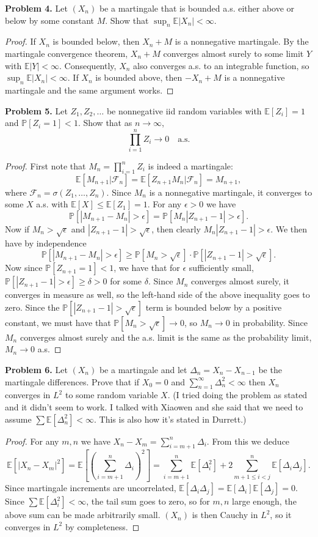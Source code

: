 \documentclass[11pt,letterpaper]{report}
\newcommand{\mcal}[1]{\mathcal{#1}}
\newcommand{\E}{\mathbb{E}}
\newcommand{\Prob}{\mathbb{P}}
\begin{document}
\noindent\textbf{Problem 4. }
Let $(X_n)$ be a martingale that is bounded a.s. either above or below by some constant $M$. Show that $\sup_n \E|X_n|<\infty$.
\begin{proof}
	If $X_n$ is bounded below, then $X_n+M$ is a nonnegative martingale. By the martingale convergence theorem, $X_n+M$ converges almost surely to some limit $Y$ with $\E|Y|<\infty$. Consequently, $X_n$ also converges a.s. to an integrable function, so $\sup_n \E|X_n|<\infty$. If $X_n$ is bounded above, then $-X_n+M$ is a nonnegative martingale and the same argument works.
\end{proof}

\noindent\textbf{Problem 5. }
Let $Z_1, Z_2, \ldots$ be nonnegative iid random variables with $\E[Z_i] = 1$ and $\Prob[Z_i = 1]<1$. Show that as $n\to \infty$,
\[
\prod_{i=1}^n Z_i\to 0\quad\text{a.s.}
\]
\begin{proof}
	First note that $M_n = \prod_{i=1}^nZ_i$ is indeed a martingale:
	\[
	\E[M_{n+1}|\mcal{F}_n] = \E[Z_{n+1}M_n|\mcal{F}_n] = M_{n+1},
	\]
	where $\mcal{F}_n = \sigma(Z_1, \ldots, Z_n)$. Since $M_n$ is a nonnegative martingale, it converges to some $X$ a.s. with $\E[X] \leq \E[Z_1] = 1$. For any $\epsilon>0$ we have
	\[
	\Prob[|M_{n+1}-M_n| > \epsilon] = \Prob[M_n|Z_{n+1}-1|>\epsilon].
	\]
	Now if $M_n>\sqrt{\epsilon}$ and $|Z_{n+1}-1|>\sqrt{\epsilon}$, then clearly $M_n|Z_{n+1}-1|>\epsilon$. We then have by independence
	\[
	\Prob[|M_{n+1}-M_n|>\epsilon] \geq \Prob[M_n>\sqrt{\epsilon}]\cdot\Prob[|Z_{n+1}-1|>\sqrt{\epsilon}].
	\]
	Now since $\Prob[Z_{n+1} = 1]<1$, we have that for $\epsilon$ sufficiently small, $\Prob[|Z_{n+1}-1|>\epsilon] \geq \delta>0$ for some $\delta$. Since $M_n$ converges almost surely, it converges in measure as well, so the left-hand side of the above inequality goes to zero. Since the $\Prob[|Z_{n+1}-1|>\sqrt{\epsilon}]$ term is bounded below by a positive constant, we must have that $\Prob[M_n>\sqrt{\epsilon}]\to 0$, so $M_n\to 0$ in probability. Since $M_n$ converges almost surely and the a.s. limit is the same as the probability limit, $M_n\to 0$ a.s.
\end{proof}

\noindent\textbf{Problem 6. }
Let $(X_n)$ be a martingale and let $\Delta_n = X_n - X_{n-1}$ be the martingale differences. Prove that if $X_0=0$ and $\sum_{n=1}^\infty \Delta_n^2<\infty$ then $X_n$ converges in $L^2$ to some random variable $X$. (I tried doing the problem as stated and it didn't seem to work. I talked with Xiaowen and she said that we need to assume $\sum \E[\Delta_n^2]<\infty$. This is also how it's stated in Durrett.)
\begin{proof}
 	For any $m, n$ we have $X_n-X_m = \sum_{i=m+1}^n \Delta_i$. From this we deduce
 	\[
 	\E[|X_n - X_m|^2] = \E\left[\left(\sum_{i=m+1}^n\Delta_i\right)^2\right] = \sum_{i=m+1}^n\E[\Delta_i^2] + 2\sum_{m+1\leq i<j}^n\E[\Delta_i\Delta_j].
 	\]
 	Since martingale increments are uncorrelated, $\E[\Delta_i\Delta_j] = \E[\Delta_i]\E[\Delta_j] = 0$. Since $\sum \E[\Delta_i^2]<\infty$, the tail sum goes to zero, so for $m,n$ large enough, the above sum can be made arbitrarily small. $(X_n)$ is then Cauchy in $L^2$, so it converges in $L^2$ by completeness.
\end{proof} 
\end{document}
